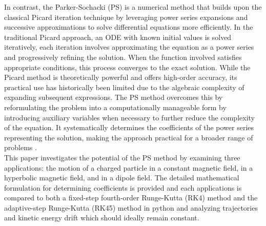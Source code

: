 \documentclass{article}
\begin{document}
In contrast, the Parker-Sochacki (PS) is a numerical method that  builds upon the classical Picard iteration technique by leveraging power series expansions and successive approximations to solve differential equations more efficiently. In the traditional Picard approach, an ODE with known initial values is solved iteratively, each iteration involves approximating the equation as a power series and progressively refining the solution. When the function involved satisfies appropriate conditions, this process converges to the exact solution. While the Picard method is theoretically powerful and offers high-order accuracy, its practical use has historically been limited due to the algebraic complexity of expanding subsequent expressions. The PS method overcomes this by reformulating the problem into a computationally manageable form by introducing auxiliary variables when necessary to further reduce the complexity of the equation. It systematically determines the coefficients of the power series representing the solution, making the approach practical for a broader range of problems \cite{parker}\cite{wolf}\cite{rudmin}.  \\

This paper investigates the potential of the PS method by examining three applications: the motion of a charged particle in a constant magnetic field, in a hyperbolic magnetic field, and in a dipole field. The detailed mathematical formulation for determining coefficients is provided and each applications is compared to both a fixed-step fourth-order Runge-Kutta (RK4) method and the adaptive-step Runge-Kutta (RK45) method in python and analyzing trajectories and kinetic energy drift which should ideally remain constant. \\
\end{document}
